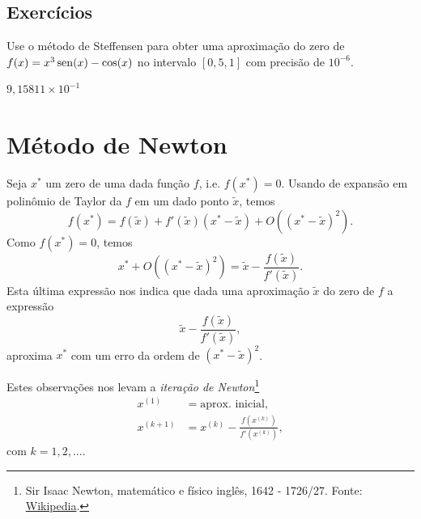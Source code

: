 \subsection*{Exercícios}

\begin{exer}\label{exer:Steffensen_1}
  Use o método de Steffensen para obter uma aproximação do zero de $f(x)=x^3\operatorname{sen}(x)-\cos(x)$ no intervalo $[0,5, 1]$ com precisão de $10^{-6}$.
\end{exer}
\begin{resp}
    $9,15811\times 10^{-1}$
\end{resp}

\section{Método de Newton}\label{cap_mef1d_sec_newton}

Seja $x^*$ um zero de uma dada função $f$, i.e. $f(x^*)=0$. Usando de expansão em polinômio de Taylor da $f$ em um dado ponto $\tilde{x}$, temos
\begin{equation}
  f(x^*) = f(\tilde{x}) + f'(\tilde{x})(x^*-\tilde{x}) + O((x^*-\tilde{x})^2).
\end{equation}
Como $f(x^*)=0$, temos
\begin{equation}
  x^* + O((x^*-\tilde{x})^2) = \tilde{x} - \frac{f(\tilde{x})}{f'(\tilde{x})}.
\end{equation}
Esta última expressão nos indica que dada uma aproximação $\tilde{x}$ do zero de $f$ a expressão
\begin{equation}
  \tilde{x} - \frac{f(\tilde{x})}{f'(\tilde{x})},
\end{equation}
aproxima $x^*$ com um erro da ordem de $(x^*-\tilde{x})^2$.

Estes observações nos levam a \emph{iteração de Newton}\footnote{Sir Isaac Newton, matemático e físico inglês, 1642 - 1726/27. Fonte: \href{https://en.wikipedia.org/wiki/Isaac_Newton}{Wikipedia}.}
\begin{align}
  x^{(1)} &= \text{aprox. inicial},\\
  x^{(k+1)} &= x^{(k)} - \frac{f(x^{(k)})}{f'(x^{(k)})},\label{eq:Newton_iteracao}
\end{align}
com $k=1, 2, \ldots$.

